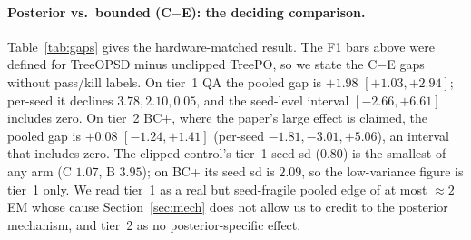 \documentclass[11pt]{article}
\begin{document}
\begin{table}[t]
\centering
\caption{Step-100 exact match. Tier~1 (QA avg) is the unweighted mean
over the four QA sets, Bamboogle (125 questions) included as printed.
C is shown GB300-scored (see text). A and D ran seed 0 only. The
untrained base scores $30.8$ on frozen HotpotQA dev (paper ReAct $31.61$)
and $22.8/6.5$ on the 500/200-question interim subsets.}
\label{tab:arms}
\end{table}

\paragraph{Posterior vs.\ bounded (C$-$E): the deciding comparison.}
Table~\ref{tab:gaps} gives the hardware-matched result. The F1 bars
above were defined for TreeOPSD minus unclipped TreePO, so we state the
C$-$E gaps without pass/kill labels. On tier~1 QA the pooled gap is
$+1.98$ $[+1.03, +2.94]$; per-seed it declines $3.78, 2.10, 0.05$, and
the seed-level interval $[-2.66, +6.61]$ includes zero. On tier~2 BC+,
where the paper's large effect is claimed, the pooled gap is $+0.08$
$[-1.24, +1.41]$ (per-seed $-1.81, -3.01, +5.06$), an interval that
includes zero. The clipped control's tier~1
seed sd ($0.80$) is the smallest of any arm (C $1.07$, B $3.95$); on BC+
its seed sd is $2.09$, so the low-variance figure is tier~1 only. We read
tier~1 as a real but seed-fragile pooled edge of at most $\approx\!2$ EM
whose cause Section~\ref{sec:mech} does not allow us to credit to the
posterior mechanism, and tier~2 as no posterior-specific effect.
\end{document}
